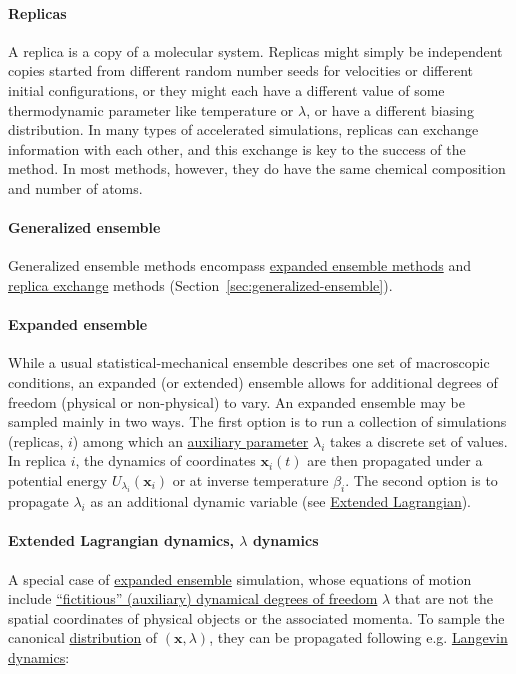 \documentclass[9pt,review]{livecoms}
\newcommand{\vx}{\mathbf{x}}
\begin{document}
\hypertarget{ref:Replica} {\paragraph{Replicas}}
A replica is a copy of a molecular system. Replicas might simply be independent copies started from different random number seeds for velocities or different initial configurations, or they might each have a different value of some thermodynamic parameter like temperature or $\lambda$, or have a different biasing distribution. In many types of accelerated simulations, replicas can exchange information with each other, and this exchange is key to the success of the method.  In most methods, however, they do have the same chemical composition and number of atoms.

\hypertarget{ref:GenEns} {\paragraph{Generalized ensemble}}
Generalized ensemble methods encompass \hyperlink{ref:ExpEns} {expanded ensemble methods} and \hyperlink{ref:ReplEx} {replica exchange} methods (Section~\ref{sec:generalized-ensemble}).

\hypertarget{ref:ExpEns} {\paragraph{Expanded ensemble}}
While a usual statistical-mechanical ensemble describes one set of macroscopic conditions, an expanded (or extended) ensemble allows for additional degrees of freedom (physical or non-physical) to vary.  An expanded ensemble may be sampled mainly in two ways. The first option is to run a collection of simulations (replicas, $i$) among which an \hyperlink{ref:AuxVar} {auxiliary parameter} $\lambda_i$ takes a discrete set of values. In replica $i$, the dynamics of coordinates $\vx_i(t)$ are then propagated under a potential energy $U_{\lambda_i}(\vx_i)$ or at inverse temperature $\beta_i$.
The second option is to propagate $\lambda_i$ as an additional dynamic variable (see \hyperlink{ref:ExtL} {Extended Lagrangian}).

\hypertarget{ref:ExtL}{\paragraph{Extended Lagrangian dynamics, $\lambda$ dynamics}}
A special case of \hyperlink{ref:ExpEns} {expanded ensemble} simulation, whose equations of motion include \hyperlink{ref:AuxVar} {``fictitious'' (auxiliary) dynamical degrees of freedom} $\lambda$ that are not the spatial coordinates of physical objects or the associated momenta.
To sample the canonical \hyperlink{ref:Distribution} {distribution} of $(\vx, \lambda)$, they can be propagated following e.g. \hyperlink{ref:Langevin} {Langevin dynamics}:
\end{document}

